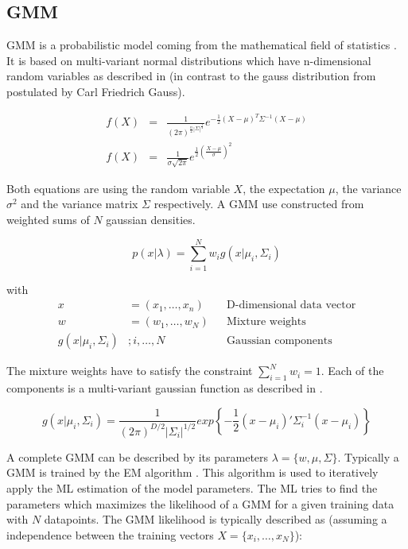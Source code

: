\subsection{\acf{GMM}}
\label{sec:gmm}

\acl{GMM} is a probabilistic model coming from the mathematical field of statistics \cite{mclachlan1988mixture}. It is based on multi-variant normal distributions which have n-dimensional random variables as described in  (in contrast to the gauss distribution from  postulated by Carl Friedrich Gauss).

\begin{eqnarray}
\label{eqn:mulgauss}
f(X) &=& \frac{
1
}{
(2\pi)^{\frac{n}{2} |\Sigma|^{\frac{1}{2}}}
} e ^ { - \frac{1}{2} (X - \mu)^T \Sigma^{-1} (X - \mu) }
\\
\label{eqn:singlegauss}
f(X) &=& \frac{1}{\sigma\sqrt{2\pi}}e^{\frac{1}{2} (\frac{X - \mu}{\sigma})^2}
\end{eqnarray}

Both equations are using the random variable $X$, the expectation $\mu$, the variance $\sigma^2$ and the variance matrix $\Sigma$ respectively. A \acl{GMM} use constructed from weighted sums of $N$ gaussian densities.

\begin{equation}
p(x|\lambda) = \sum_{i=1}^{N} w_i g(x| \mu_i, \Sigma_i)
\end{equation}

with
\begin{align*}
x & = (x_{1},\dotsc,x_{n}) && \text{D-dimensional data vector}\\
w & = (w_1,\dots,w_{N}) && \text{Mixture weights}\\
g(x| \mu_i, \Sigma_i) & ; i,\dots,N && \text{Gaussian components}
\end{align*}

The mixture weights have to satisfy the constraint $\sum_{i=1}^N w_i = 1$. Each of the components is a multi-variant gaussian function as described in .

\begin{equation}
\label{eqn:gauss_func}
g(x|\mu_i, \Sigma_i) = \frac{1}{(2\pi)^{D/2} | \Sigma_i |^{1/2}} exp \left\{ - \frac{1}{2} (x - \mu_i)' \Sigma_i^{-1} (x - \mu_i) \right\}
\end{equation}

A complete \ac{GMM} can be described by its parameters $\lambda = \{w, \mu, \Sigma\}$. Typically a \ac{GMM} is trained by the \acf{EM} algorithm \cite{dempster1977maximum}. This algorithm is used to iteratively apply the \ac{ML} estimation of the model parameters. The \ac{ML} tries to find the parameters which maximizes the likelihood of a \ac{GMM} for a given training data with $N$ datapoints. The \ac{GMM} likelihood is typically described as (assuming a independence between the training vectors $X = \{x_i,\dots,x_N\}$):

